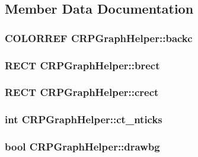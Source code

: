 \subsection{Member Data Documentation}
\hypertarget{classCRPGraphHelper_a4e660634269de516fe6cf4ba79daa1bc}{
\subsubsection[{backc}]{\setlength{\rightskip}{0pt plus 5cm}COLORREF {\bf CRPGraphHelper::backc}}}
\label{classCRPGraphHelper_a4e660634269de516fe6cf4ba79daa1bc}
\hypertarget{classCRPGraphHelper_a2452ab0d7da50431a764936515d17fee}{
\subsubsection[{brect}]{\setlength{\rightskip}{0pt plus 5cm}RECT {\bf CRPGraphHelper::brect}}}
\label{classCRPGraphHelper_a2452ab0d7da50431a764936515d17fee}
\hypertarget{classCRPGraphHelper_adac8a88e355b5a93c0907c9d0ffcbaa7}{
\subsubsection[{crect}]{\setlength{\rightskip}{0pt plus 5cm}RECT {\bf CRPGraphHelper::crect}}}
\label{classCRPGraphHelper_adac8a88e355b5a93c0907c9d0ffcbaa7}
\hypertarget{classCRPGraphHelper_a07e0fef03b037dd04265e6bfbc8fcab4}{
\subsubsection[{ct\_\-nticks}]{\setlength{\rightskip}{0pt plus 5cm}int {\bf CRPGraphHelper::ct\_\-nticks}}}
\label{classCRPGraphHelper_a07e0fef03b037dd04265e6bfbc8fcab4}
\hypertarget{classCRPGraphHelper_a68332897bff16b25b6aeab160e4a5bc1}{
\subsubsection[{drawbg}]{\setlength{\rightskip}{0pt plus 5cm}bool {\bf CRPGraphHelper::drawbg}}}
